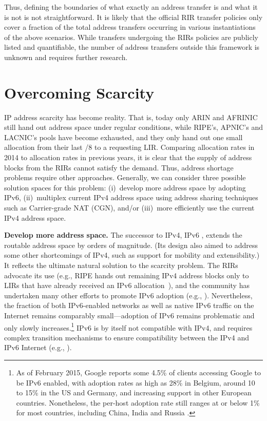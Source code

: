 \documentclass[letter]{sigcomm-alternate}
\begin{document}
Thus, defining the boundaries of what exactly an address transfer is and what
it is not is not straightforward.  It is likely that the official RIR transfer
policies only cover a fraction of the total address transfers occurring in
various instantiations of the above scenarios. While transfers undergoing the
RIRs policies are publicly listed
\cite{arin_transfers,ripe_transfers,apnic_transfers} and quantifiable, the
number of address transfers outside this framework is unknown and requires
further research.

\section{Overcoming Scarcity}

IP address scarcity has become reality. That is, today only ARIN and
AFRINIC still hand out address space under regular conditions, while RIPE's,
APNIC's and LACNIC's pools have become exhausted, and they only hand out
one small
allocation from their last /8 to a requesting LIR. Comparing allocation rates
in 2014 to allocation rates in previous years, it is clear that the supply of
address blocks from the RIRs cannot satisfy the demand. Thus, address shortage
problems require other approaches.  Generally, we can consider three possible
solution spaces for this problem: (i)~develop more address space by
adopting IPv6, (ii)~multiplex current IPv4 address space using address
sharing techniques such as Carrier-grade NAT (CGN), and/or (iii)~more
efficiently use the current IPv4 address space.

\textbf{Develop more address space.}
The successor to IPv4, IPv6 \cite{rfc1883}, extends the routable address space
by orders of magnitude.  (Its design also aimed to address some other 
shortcomings of IPv4, such as support for mobility and extensibility.) It 
reflects the ultimate natural solution to the scarcity problem.  The RIRs 
advocate its use (e.g., RIPE hands out remaining IPv4 address blocks only to 
LIRs that have already received an IPv6 allocation~\cite{ripe_policy}), and the 
community has undertaken many other efforts to promote IPv6 adoption (e.g.,
\cite{ipv6launch}).  Nevertheless, the fraction of both IPv6-enabled networks
as well as native IPv6 traffic on the Internet remains comparably
small---adoption of IPv6 remains problematic 
and only slowly increases.\footnote{
	As of February 2015, Google reports some 4.5\% of clients accessing Google 
	to be IPv6 enabled, with adoption rates as high as 28\% in 
	Belgium, around 10 to 15\% in the US and Germany, and increasing support
	in other European countries. Nonetheless, the per-host
	adoption rate still ranges at or below 1\% for most countries, including
	China, India and Russia \cite{google_ipv6}.}
IPv6 is by itself not compatible with IPv4, and requires
complex transition mechanisms to ensure compatibility between the 
IPv4 and IPv6 Internet (e.g., \cite{rfc4213}).
\end{document}
